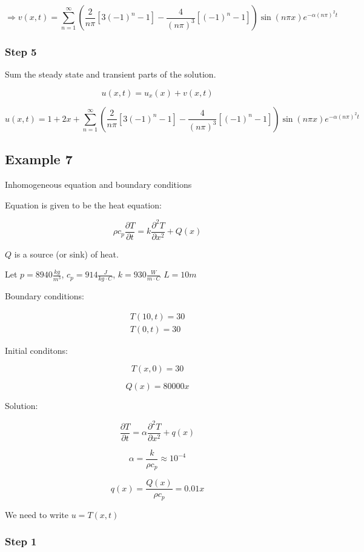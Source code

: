 \documentclass{article}
\begin{document}
$$\Rightarrow v(x,t) = \sum_{n = 1}^\infty \left( \frac{2}{n \pi} \left[ 3(-1)^n - 1 \right] - \frac{4}{(n \pi)^3} \left[(-1)^n - 1 \right] \right) \sin(n \pi x) e^{-\alpha (n \pi)^2 t}$$

\subsubsection{Step 5}

Sum the steady state and transient parts of the solution. 

$$u(x,t) = u_x (x) + v(x,t)$$

$$u(x,t) = 1 + 2x + \sum_{n = 1}^\infty \left( \frac{2}{n \pi} \left[ 3(-1)^n - 1 \right] - \frac{4}{(n \pi)^3} \left[(-1)^n - 1 \right] \right) \sin(n \pi x) e^{-\alpha (n \pi)^2 t}$$

\subsection{Example 7}

Inhomogeneous equation and boundary conditions

Equation is given to be the heat equation:

$$\rho c_p \frac{\partial T}{\partial t} = k \frac{\partial^2 T}{\partial x^2} + Q(x)$$

$Q$ is a source (or sink) of heat. 

Let $p = 8940 \frac{kg}{m^3}$, $c_p = 914 \frac{J}{kg \cdot C}$, $k = 930 \frac{W}{m \cdot C}$ $L = 10 m$

Boundary conditions:

$$\begin{matrix} T(10,t) = 30 \\ T(0,t) = 30 \end{matrix}$$

Initial conditons:

$$T(x,0) = 30$$

$$Q(x) = 80000 x$$

Solution:

$$\frac{\partial T}{\partial t} = \alpha \frac{\partial^2 T}{\partial x^2} + q(x)$$

$$\alpha = \frac{k}{\rho c_p} \approx 10^{-4}$$

$$q(x) = \frac{Q(x)}{\rho c_p} = 0.01 x$$

We need to write $u = T(x,t)$

\subsubsection{Step 1}
\end{document}
